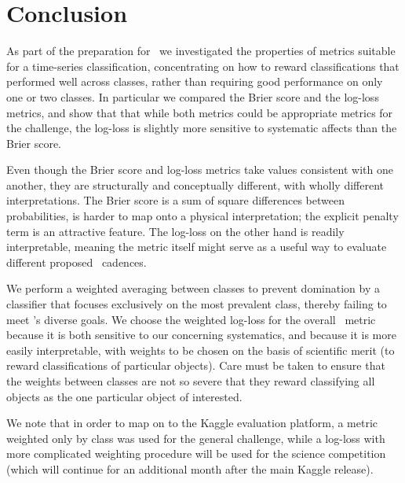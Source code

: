 \section{Conclusion}
\label{sec:conclusion}

As part of the preparation for \plasticc\, we investigated the properties of metrics suitable for a time-series classification, concentrating on how to reward classifications that performed well across classes, rather than requiring good performance on only one or two classes. In particular we compared the Brier score and the log-loss metrics, and show that that while both metrics could be appropriate metrics for the challenge, the log-loss is slightly more sensitive to systematic affects than the Brier score.

% 
Even though the Brier score and log-loss metrics take values consistent with one another, they are structurally and conceptually different, with wholly different interpretations.
The Brier score is a sum of square differences between probabilities, is harder to map onto a physical interpretation; the explicit penalty term is an attractive feature. The log-loss on the other hand is readily interpretable, meaning the metric itself might serve as a useful way to evaluate different proposed \lsst\ cadences.
 

We perform a weighted averaging between classes to prevent domination by a classifier that focuses exclusively on the most prevalent class, thereby failing to meet \plasticc's diverse goals.  We choose the weighted log-loss for the overall \plasticc\ metric because it is both sensitive to our concerning systematics, and because it is more easily interpretable, with weights to be chosen on the basis of scientific merit (to reward classifications of particular objects). Care must be taken to ensure that the weights between classes are not so severe that they reward classifying all objects as the one particular object of interested.

We note that in order to map on to the Kaggle evaluation platform, a metric weighted only by class was used for the general challenge, while a log-loss with more complicated weighting procedure will be used for the science competition (which will continue for an additional month after the main Kaggle release).

